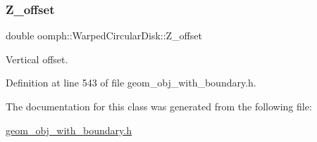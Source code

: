 \mbox{\label{classoomph_1_1WarpedCircularDisk_a7f07f7318757578b6c703d518174a811}} 
\subsubsection{\texorpdfstring{Z\+\_\+offset}{Z\_offset}}
{\footnotesize\ttfamily double oomph\+::\+Warped\+Circular\+Disk\+::\+Z\+\_\+offset\hspace{0.3cm}{\ttfamily [private]}}



Vertical offset. 



Definition at line 543 of file geom\+\_\+obj\+\_\+with\+\_\+boundary.\+h.



The documentation for this class was generated from the following file\+:\begin{DoxyCompactItemize}
\item 
\hyperlink{geom__obj__with__boundary_8h}{geom\+\_\+obj\+\_\+with\+\_\+boundary.\+h}\end{DoxyCompactItemize}

